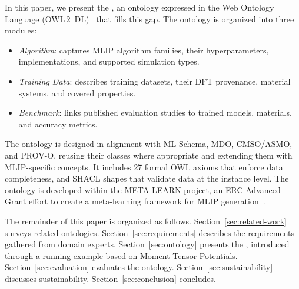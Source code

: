 In this paper, we present the \emph{\MLIPsOntology{}}, an ontology
expressed in the Web Ontology Language
(OWL\,2~DL)~\cite{owl2overview} that fills this gap. The ontology is organized into three modules:
%
\begin{itemize}
\item \emph{Algorithm}: captures MLIP algorithm families, their
  hyperparameters, implementations, and supported simulation types.
\item \emph{Training Data}: describes training datasets, their DFT
  provenance, material systems, and covered properties.
\item \emph{Benchmark}: links published evaluation studies to trained
  models, materials, and accuracy metrics.
\end{itemize}
%
The ontology is designed in alignment with ML-Schema, MDO, CMSO/ASMO, and
PROV-O, reusing their classes where appropriate and extending them with
MLIP-specific concepts. It includes 27 formal OWL axioms that enforce data
completeness, and SHACL shapes that validate data at the instance level.
The ontology is developed within the META-LEARN project, an ERC Advanced
Grant effort to create a meta-learning framework for MLIP
generation~\cite{grabowski2024metalearnerc}.

The remainder of this paper is organized as follows.
Section~\ref{sec:related-work} surveys related ontologies.
Section~\ref{sec:requirements} describes the requirements gathered from
domain experts.
Section~\ref{sec:ontology} presents the \MLIPsOntology{}, introduced through
a running example based on Moment Tensor Potentials.
Section~\ref{sec:evaluation} evaluates the ontology.
Section~\ref{sec:sustainability} discusses sustainability.
Section~\ref{sec:conclusion} concludes.

